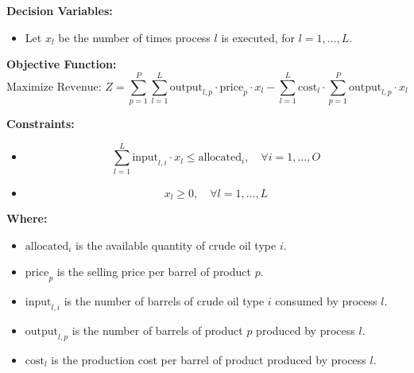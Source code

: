 \documentclass{article}
\begin{document}
\textbf{Decision Variables:}
\begin{itemize}
    \item Let \( x_l \) be the number of times process \( l \) is executed, for \( l = 1, \ldots, L \).
\end{itemize}

\textbf{Objective Function:}
\[
\text{Maximize Revenue: } Z = \sum_{p=1}^{P} \sum_{l=1}^{L} \text{output}_{l,p} \cdot \text{price}_p \cdot x_l - \sum_{l=1}^{L} \text{cost}_l \cdot \sum_{p=1}^{P} \text{output}_{l,p} \cdot x_l
\]

\textbf{Constraints:}
\begin{itemize}
    \item {}
    \[
    \sum_{l=1}^{L} \text{input}_{l,i} \cdot x_l \leq \text{allocated}_i, \quad \forall i = 1, \ldots, O
    \]

    \item {}
    \[
    x_l \geq 0, \quad \forall l = 1, \ldots, L
    \]
\end{itemize}

\textbf{Where:}
\begin{itemize}
    \item \( \text{allocated}_i \) is the available quantity of crude oil type \( i \).
    \item \( \text{price}_p \) is the selling price per barrel of product \( p \).
    \item \( \text{input}_{l,i} \) is the number of barrels of crude oil type \( i \) consumed by process \( l \).
    \item \( \text{output}_{l,p} \) is the number of barrels of product \( p \) produced by process \( l \).
    \item \( \text{cost}_l \) is the production cost per barrel of product produced by process \( l \).
\end{itemize}
\end{document}

